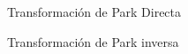 \documentclass[a4paper, 10pt, onecolumn,journal]{ieeeconf}
\begin{document}
\begin{figure}[thpb]
    \centering
    \begin{adjustbox}{max width=\columnwidth}
    \end{adjustbox}
    \caption{Transformación de Park Directa}
    \label{transformacion de Park}
\end{figure}

\begin{figure}[thpb]
    \centering
    \begin{adjustbox}{max width=\columnwidth}
    \end{adjustbox}
    \caption{Transformación de Park inversa}
    \label{transformacion de Park inversa}
\end{figure}

\end{document}
